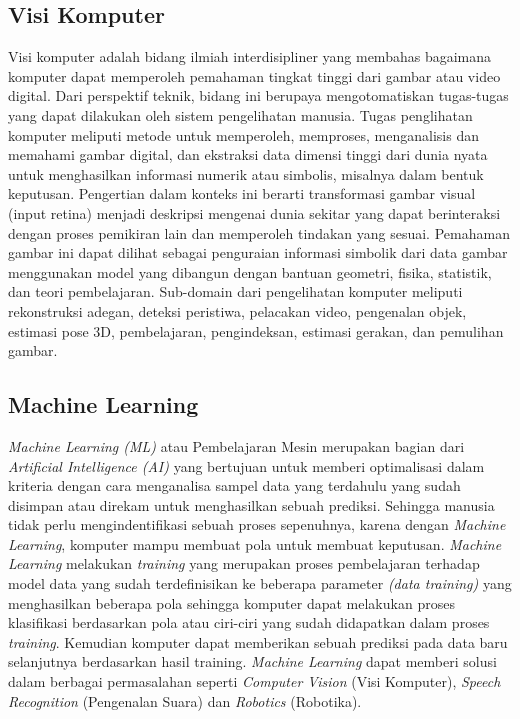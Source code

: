 \subsection{Visi Komputer}
Visi komputer adalah bidang ilmiah interdisipliner yang membahas bagaimana komputer dapat memperoleh 
pemahaman tingkat tinggi dari gambar atau video digital. Dari perspektif teknik, bidang ini berupaya 
mengotomatiskan tugas-tugas yang dapat dilakukan oleh sistem pengelihatan  manusia. Tugas  penglihatan 
komputer   meliputi metode untuk memperoleh, memproses, menganalisis dan memahami gambar digital, dan 
ekstraksi data dimensi tinggi dari dunia nyata untuk menghasilkan informasi numerik atau simbolis, 
misalnya dalam bentuk keputusan. Pengertian dalam konteks ini berarti transformasi gambar visual 
(input retina) menjadi deskripsi mengenai dunia sekitar yang dapat berinteraksi dengan proses pemikiran 
lain dan memperoleh tindakan yang sesuai. Pemahaman gambar ini dapat dilihat sebagai penguraian informasi 
simbolik dari data gambar menggunakan model yang dibangun dengan bantuan geometri, fisika, statistik, dan 
teori pembelajaran. Sub-domain dari pengelihatan komputer meliputi rekonstruksi adegan, deteksi peristiwa, 
pelacakan video, pengenalan objek, estimasi pose 3D, pembelajaran, pengindeksan, estimasi gerakan, dan 
pemulihan gambar\citep{MachineVisionMachineLearning}.

\subsection{Machine Learning}
\textit{Machine Learning (ML)} atau Pembelajaran Mesin merupakan bagian dari \textit{Artificial Intelligence (AI)} yang 
bertujuan untuk memberi optimalisasi dalam kriteria dengan cara menganalisa sampel data yang terdahulu 
yang sudah disimpan atau direkam untuk menghasilkan sebuah prediksi. Sehingga manusia tidak perlu 
mengindentifikasi sebuah proses sepenuhnya, karena dengan \textit{Machine Learning}, komputer mampu membuat pola 
untuk membuat keputusan. \textit{Machine Learning} melakukan \textit{training} yang merupakan proses pembelajaran terhadap 
model data yang sudah terdefinisikan ke beberapa parameter \textit{(data training)} yang menghasilkan beberapa 
pola sehingga komputer dapat melakukan proses klasifikasi berdasarkan pola atau ciri-ciri yang sudah 
didapatkan dalam proses \textit{training}. Kemudian komputer dapat memberikan sebuah prediksi pada data baru 
selanjutnya berdasarkan hasil training. \textit{Machine Learning} dapat memberi solusi dalam berbagai permasalahan
seperti \textit{Computer Vision} (Visi Komputer), \textit{Speech Recognition} (Pengenalan Suara) dan \textit{Robotics} (Robotika)\citep{MachineLearning}.

